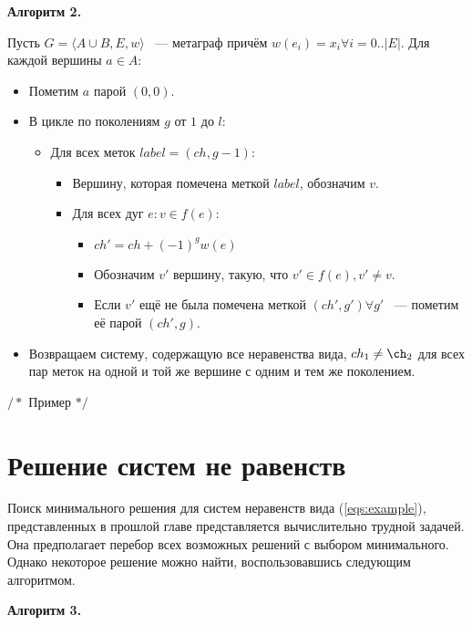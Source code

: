 \documentclass[14pt]{mmcs-article}
\begin{document}
\textbf{Алгоритм 2.}


Пусть $G = \langle A \cup B, E,w\rangle$ ~--- метаграф причём $w(e_i) = x_i \forall i = 0..|E|$. Для каждой вершины $a \in A:$

\begin{itemize}
    \item Пометим $a$ парой $(0, 0)$.
    \item В цикле по поколениям $g$ от $1$ до $l$:
      \begin{itemize}
      \item Для всех меток $label = (ch, g - 1)$:
        \begin{itemize}
        \item Вершину, которая помечена меткой $label$, обозначим $v$.
        \item Для всех дуг $e: v \in f(e)$:
          \begin{itemize}
          \item $ch' = ch + (-1)^{g} w(e)$
          \item Обозначим $v'$ вершину, такую, что $v' \in f(e), v' \neq v$.
          \item Если $v'$ ещё не была помечена меткой $(ch', g') \forall g'$ ~--- пометим её парой $(ch', g)$.
          \end{itemize}
        \end{itemize}
      \end{itemize}
    \item Возвращаем систему, содержащую все неравенства вида, $ch_1 \neq \ch_2$ для всех пар меток на одной и той же вершине с одним и тем же поколением.
\end{itemize}

$/*$ Пример $*/$

\section*{Решение систем не равенств}

Поиск минимального решения для систем неравенств вида (\ref{eqs:example}), представленных в прошлой главе представляется вычислительно трудной задачей. Она предполагает перебор всех возможных решений с выбором минимального. Однако некоторое решение можно найти, воспользовавшись следующим алгоритмом.

\textbf{Алгоритм 3.}
\end{document}
